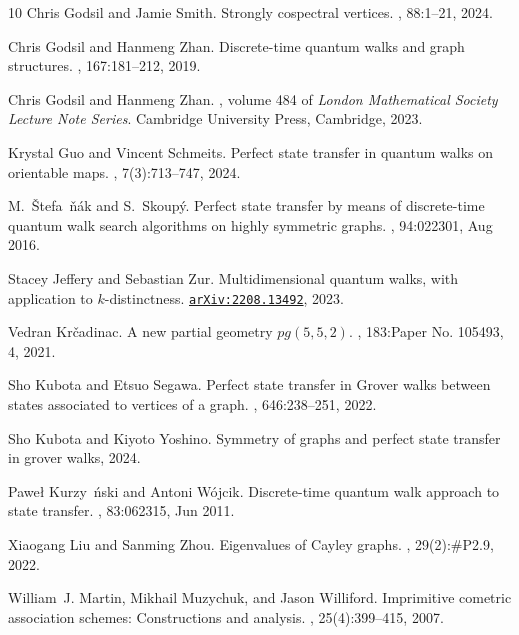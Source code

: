 \documentclass{article}
\numberwithin{equation}{section}
\newcommand{\arxiv}[1]{\href{https://arxiv.org/abs/#1}{\texttt{arXiv:#1}}}
\begin{document}
\begin{thebibliography}{10}
Chris Godsil and Jamie Smith.
\newblock Strongly cospectral vertices.
, 88:1--21, 2024.

Chris Godsil and Hanmeng Zhan.
\newblock Discrete-time quantum walks and graph structures.
, 167:181--212, 2019.

Chris Godsil and Hanmeng Zhan.
, volume 484 of {\em London Mathematical Society Lecture Note Series}.
\newblock Cambridge University Press, Cambridge, 2023.

Krystal Guo and Vincent Schmeits.
\newblock Perfect state transfer in quantum walks on orientable maps.
, 7(3):713--747, 2024.

M.~\ifmmode {}\else \v{S}\fi{}tefa\ifmmode~\else \v{n}\fi{}\'ak and S.~Skoup\'y.
\newblock Perfect state transfer by means of discrete-time quantum walk search algorithms on highly symmetric graphs.
, 94:022301, Aug 2016.

Stacey Jeffery and Sebastian Zur.
\newblock Multidimensional quantum walks, with application to $k$-distinctness.
\newblock \arxiv{2208.13492}, 2023.

Vedran Kr\v{c}adinac.
\newblock A new partial geometry {$pg(5,5,2)$}.
, 183:Paper No. 105493, 4, 2021.

Sho Kubota and Etsuo Segawa.
\newblock Perfect state transfer in {G}rover walks between states associated to vertices of a graph.
, 646:238--251, 2022.

Sho Kubota and Kiyoto Yoshino.
\newblock Symmetry of graphs and perfect state transfer in grover walks, 2024.

Pawe\l{} Kurzy\ifmmode~\else \'{n}\fi{}ski and Antoni W\'ojcik.
\newblock Discrete-time quantum walk approach to state transfer.
, 83:062315, Jun 2011.

Xiaogang Liu and Sanming Zhou.
\newblock Eigenvalues of Cayley graphs.
, 29(2):{\#P}2.9, 2022.

William~J. Martin, Mikhail Muzychuk, and Jason Williford.
\newblock Imprimitive cometric association schemes: Constructions and analysis.
, 25(4):399--415, 2007.


\end{thebibliography}
\end{document}
